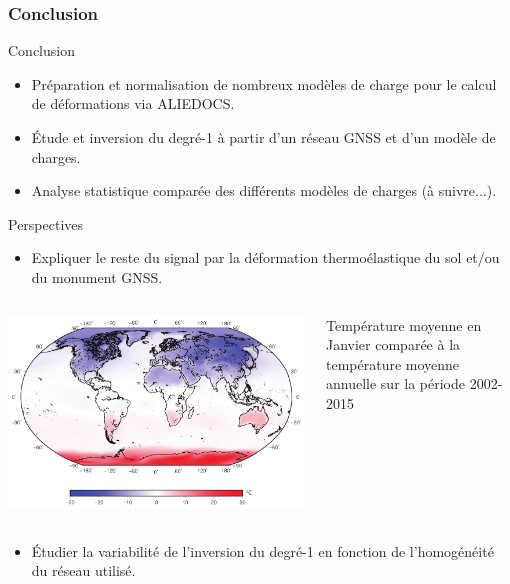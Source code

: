 \documentclass[9pt]{beamer}
\begin{document}
\begin{frame}
\frametitle{Conclusion}
\begin{block}{Conclusion}
     \begin{itemize}
        \item Préparation et normalisation de nombreux modèles de charge pour le calcul de déformations via ALIEDOCS.
        \item Étude et inversion du degré-1 à partir d'un réseau GNSS et d'un modèle de charges.
        \item Analyse statistique comparée des différents modèles de charges (à suivre...).
\end{itemize}
     \end{block}

\begin{block}{Perspectives}
\begin{itemize}
    \item Expliquer le reste du signal par la déformation thermoélastique du sol et/ou du monument GNSS.
\end{itemize}
\begin{columns}
        \begin{column}{0.6\textwidth}
            \centering
            \includegraphics[height=0.26\textheight]{figures/temperature_field.png}
        \end{column}
        \begin{column}{0.4\textwidth}
            \small{Température moyenne en Janvier comparée à la température moyenne annuelle sur la période 2002-2015}
        \end{column}
\end{columns}
\begin{itemize}
    \item Étudier la variabilité de l'inversion du degré-1 en fonction de l'homogénéité du réseau utilisé.
\end{itemize}


\end{block}
\end{frame}
\end{document}
